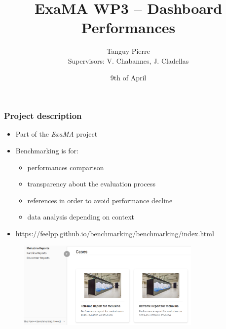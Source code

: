 \documentclass[10pt]{beamer}
\title{\textbf{ExaMA WP3 -- Dashboard Performances}}
\author[Tanguy PIERRE]{Tanguy Pierre\\[1cm] \small{Supervisors: V. Chabannes, J. Cladellas}}
\institute{University of Strasbourg}
\date{9th of April}
\begin{document}
\frame{\titlepage}


\begin{frame}
    \frametitle{\textbf{Project description}}

    \begin{itemize}
        \addtolength{\itemsep}{10pt}
        \item Part of the \textit{ExaMA} project
        \item Benchmarking is for:
        \begin{itemize}
            \item performances comparison
            \item transparency about the evaluation process
            \item references in order to avoid performance decline
            \item data analysis depending on context
        \end{itemize}
        \item {\footnotesize\url{https://feelpp.github.io/benchmarking/benchmarking/index.html}}
    \end{itemize}
    \begin{figure}
        \centering
        \includegraphics[width=0.8\textwidth]{../../illustrations/feelpp-dashboard.png}
      \end{figure}
\end{frame}
\end{document}
